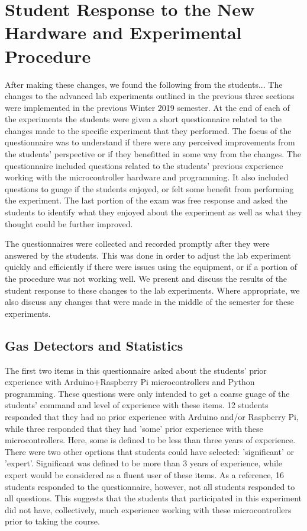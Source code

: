 \section{Student Response to the New Hardware and Experimental Procedure}
After making these changes, we found the following from the students...
The changes to the advanced lab experiments outlined in the previous three sections were implemented in the previous Winter 2019 semester.
At the end of each of the experiments the students were given a short questionnaire related to the changes made to the specific experiment that they performed.
The focus of the questionnaire was to understand if there were any perceived improvements from the students' perspective or if they benefitted in some way from the changes.
The questionnaire included questions related to the students' previous experience working with the microcontroller hardware and programming.
It also included questions to guage if the students enjoyed, or felt some benefit from performing the experiment.
The last portion of the exam was free response and asked the students to identify what they enjoyed about the experiment as well as what they thought could be further improved.

The questionnaires were collected and recorded promptly after they were answered by the students.
This was done in order to adjust the lab experiment quickly and efficiently if there were issues using the equipment, or if a portion of the procedure was not working well.
We present and discuss the results of the student response to these changes to the lab experiments.
Where appropriate, we also discuss any changes that were made in the middle of the semester for these experiments.

\subsection{Gas Detectors and Statistics}
The first two items in this questionnaire asked about the students' prior experience with Arduino+Raspberry Pi microcontrollers and Python programming.
These questions were only intended to get a coarse guage of the students' command and level of experience with these items.
12 students responded that they had no prior experience with Arduino and/or Raspberry Pi, while three responded that they had 'some' prior experience with these microcontrollers.
Here, some is defined to be less than three years of experience.
There were two other oprtions that students could have selected: 'significant' or 'expert'.
Significant was defined to be more than 3 years of experience, while expert would be considered as a fluent user of these items.
As a reference, 16 students responded to the questionnaire, however, not all students responded to all questions.
This suggests that the students that participated in this experiment did not have, collectively, much experience working with these microcontrollers prior to taking the course.

